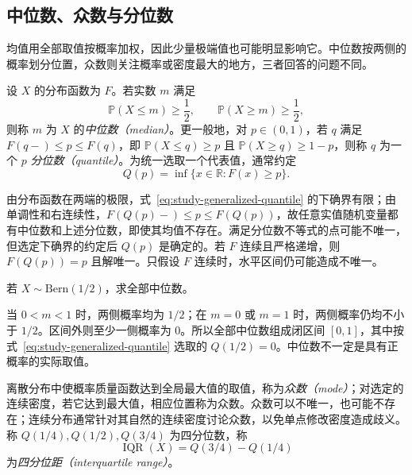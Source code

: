 \subsection{中位数、众数与分位数}
\label{subsec:study-location-quantiles}

均值用全部取值按概率加权，因此少量极端值也可能明显影响它。中位数按两侧的概率划分位置，众数则关注概率或密度最大的地方，三者回答的问题不同。

\begin{definition}
\label{def:study-median-quantile}
设 $X$ 的分布函数为 $F$。若实数 $m$ 满足
\begin{equation}
  \mathbb P(X\le m)\ge\frac12,\qquad
  \mathbb P(X\ge m)\ge\frac12,
  \label{eq:study-median}
\end{equation}
则称 $m$ 为 $X$ 的\emph{中位数（median）}。更一般地，对 $p\in(0,1)$，若 $q$ 满足 $F(q-)\le p\le F(q)$，即 $\mathbb P(X\le q)\ge p$ 且 $\mathbb P(X\ge q)\ge1-p$，则称 $q$ 为一个 $p$ \emph{分位数（quantile）}。为统一选取一个代表值，通常约定
\begin{equation}
  Q(p)=\inf\{x\in\mathbb R:F(x)\ge p\}.
  \label{eq:study-generalized-quantile}
\end{equation}
\end{definition}

由分布函数在两端的极限，式~\eqref{eq:study-generalized-quantile} 的下确界有限；由单调性和右连续性，$F(Q(p)-)\le p\le F(Q(p))$，故任意实值随机变量都有中位数和上述分位数，即使其均值不存在。满足分位数不等式的点可能不唯一，但选定下确界的约定后 $Q(p)$ 是确定的。若 $F$ 连续且严格递增，则 $F(Q(p))=p$ 且解唯一。只假设 $F$ 连续时，水平区间仍可能造成不唯一。

\begin{example}
\label{ex:study-bernoulli-medians}
若 $X\sim\mathrm{Bern}(1/2)$，求全部中位数。
\end{example}

\begin{solve}
当 $0<m<1$ 时，两侧概率均为 $1/2$；在 $m=0$ 或 $m=1$ 时，两侧概率仍均不小于 $1/2$。区间外则至少一侧概率为 $0$。所以全部中位数组成闭区间 $[0,1]$，其中按式~\eqref{eq:study-generalized-quantile} 选取的 $Q(1/2)=0$。中位数不一定是具有正概率的实际取值。
\end{solve}

\begin{definition}
\label{def:study-mode-iqr}
离散分布中使概率质量函数达到全局最大值的取值，称为\emph{众数（mode）}；对选定的连续密度，若它达到最大值，相应位置称为众数。众数可以不唯一，也可能不存在；连续分布通常针对其自然的连续密度讨论众数，以免单点修改密度造成歧义。称 $Q(1/4),Q(1/2),Q(3/4)$ 为四分位数，称
\[
  \operatorname{IQR}(X)=Q(3/4)-Q(1/4)
\]
为\emph{四分位距（interquartile range）}。
\end{definition}

